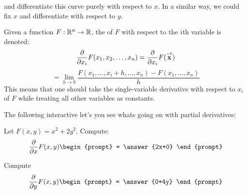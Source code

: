 \documentclass{ximera}
\begin{document}
\begin{image}
\end{image}
and differentiate this curve purely with respect to $x$. In a similar way, we could fix $x$ and differentiate with respect to $y$.

\begin{definition}
  Given a function $F:\mathbb R^n\to\mathbb R$, the  of $F$
  with respect to the $i$th variable is denoted:
  \[
  \frac{\partial }{\partial x_i} F(x_1,x_2,\dots,x_n) = \frac{\partial }{\partial x_i} F({\overset{\boldsymbol{\rightharpoonup}}{\mathbf{x}}})
  \]
  \[
  = \lim_{h\to 0} \frac{F(x_1,\dots,x_i+h,\dots,x_n) - F(x_1,\dots,x_n)}{h}
  \]
  This means that one should take the single-variable derivative with
  respect to $x_i$ of $F$ while treating all other variables as
  constants.
\end{definition}

\begin{onlineOnly}
  The following interactive let's you see whats going on with partial derivatives:
  \begin{center}
  \end{center}
\end{onlineOnly}


\begin{question}
  Let $F(x,y) = x^2+2y^2$. Compute:
  \[
  \pp{x} F(x,y)
  \begin{prompt}
    = \answer{2x+0}
  \end{prompt}
  \]
  \begin{question}
    Compute
  \[
  \pp{y} F(x,y)
  \begin{prompt}
    = \answer{0+4y}
  \end{prompt}
  \]
  \end{question}
\end{question}
\end{document}
